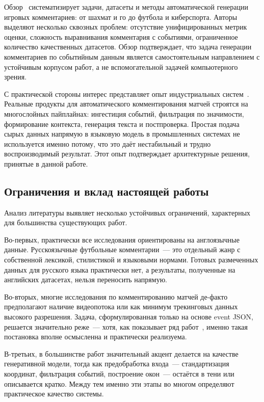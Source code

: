 \documentclass[a4paper,14pt]{extarticle}
\numberwithin{table}{section}
\numberwithin{figure}{section}
\numberwithin{equation}{section}
\begin{document}
Обзор~\cite{aigccsurvey} систематизирует задачи, датасеты и методы автоматической генерации игровых комментариев: от шахмат и го до футбола и киберспорта. Авторы выделяют несколько сквозных проблем: отсутствие унифицированных метрик оценки, сложность выравнивания комментария с событиями, ограниченное количество качественных датасетов. Обзор подтверждает, что задача генерации комментариев по событийным данным является самостоятельным направлением с устойчивым корпусом работ, а не вспомогательной задачей компьютерного зрения.

С практической стороны интерес представляет опыт индустриальных систем~\cite{industry2026}. Реальные продукты для автоматического комментирования матчей строятся на многослойных пайплайнах: ингестиция событий, фильтрация по значимости, формирование контекста, генерация текста и постпроверка. Простая подача сырых данных напрямую в языковую модель в промышленных системах не используется именно потому, что это даёт нестабильный и трудно воспроизводимый результат. Этот опыт подтверждает архитектурные решения, принятые в данной работе.

\subsection{Ограничения и вклад настоящей работы}

Анализ литературы выявляет несколько устойчивых ограничений, характерных для большинства существующих работ.

Во-первых, практически все исследования ориентированы на англоязычные данные. Русскоязычные футбольные комментарии~--- это отдельный жанр с собственной лексикой, стилистикой и языковыми нормами. Готовых размеченных данных для русского языка практически нет, а результаты, полученные на английских датасетах, нельзя переносить напрямую.

Во-вторых, многие исследования по комментированию матчей де-факто предполагают наличие видеопотока или как минимум трекинговых данных высокого разрешения. Задача, сформулированная только на основе event JSON, решается значительно реже~--- хотя, как показывает ряд работ~\cite{wang2022commentary,lfc2025,matchtime2024}, именно такая постановка вполне осмысленна и практически реализуема.

В-третьих, в большинстве работ значительный акцент делается на качестве генеративной модели, тогда как предобработка входа~--- стандартизация координат, фильтрация событий, построение окон~--- остаётся в тени или описывается кратко. Между тем именно эти этапы во многом определяют практическое качество системы.
\end{document}
